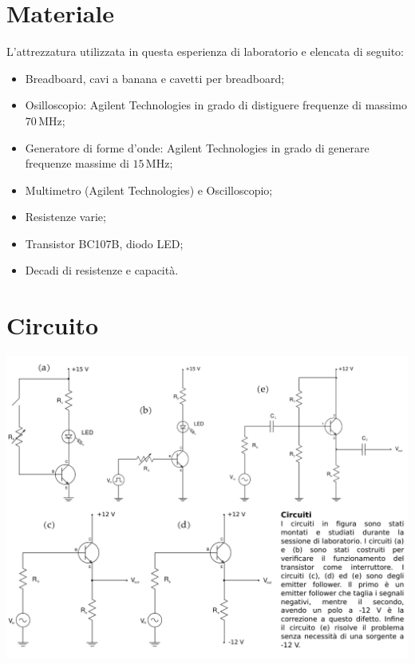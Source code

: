 \section*{Materiale}

L'attrezzatura utilizzata in questa esperienza di laboratorio e elencata di seguito:

\begin{itemize}
    \setlength{\itemsep}{1pt}
    \item{Breadboard, cavi a banana e cavetti per breadboard;}
    \item{Osilloscopio: Agilent Technologies in grado di distiguere frequenze di massimo $70\,\si{\mega\hertz}$;}
    \item{Generatore di forme d'onde: Agilent Technologies in grado di generare frequenze massime di $15\,\si{\mega\hertz}$;}
    \item{Multimetro (Agilent Technologies) e Oscilloscopio;}
    \item{Resistenze varie;}
    \item{Transistor BC107B, diodo LED;}
    \item{Decadi di resistenze e capacità.}
\end{itemize}

\section*{Circuito}

\includegraphics[width=\textwidth]{circuiti.pdf}
